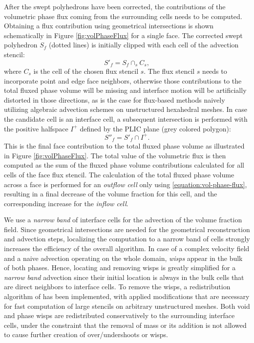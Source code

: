 After the swept polyhedrons have been corrected, the contributions of the volumetric
phase flux coming from the surrounding cells needs to be computed. Obtaining a
flux contribution using geometrical intersections is shown schematically in
Figure \ref{fig:volPhaseFlux} for a single face. The corrected swept 
polyhedron $S_f$ (dotted lines) is initially clipped with each cell of the 
advection stencil:
%
\begin{equation}
   S'_f = S_f \cap_s C_s,  
\end{equation}
%
where $C_s$ is the cell of the chosen flux stencil $s$. The flux stencil $s$
needs to incorporate point and edge face neighbors, otherwise those
contributions to the total fluxed phase volume will be missing and interface
motion will be artificially distorted in those directions, as is the case
for flux-based methods naively utilizing algebraic advection schemes on 
unstructured hexahedral meshes. In case the candidate cell is an interface 
cell, a subsequent intersection is performed with the positive halfspace 
$I^+$ defined by the PLIC plane (grey colored polygon):
%
\begin{equation}
    S''_f = S'_f \cap I^+.
\end{equation}
%
This is the final face contribution to the total fluxed phase volume as illustrated
in Figure \ref{fig:volPhaseFlux}. The total value of the volumetric flux is
then computed as the sum of the fluxed phase volume contributions calculated for
all cells of the face flux stencil. The calculation of the total fluxed phase
volume across a face is performed for an \emph{outflow cell} only using 
\eqref{equation:vol-phase-flux}, resulting in a final decrease of the volume 
fraction for this cell, and the corresponding increase for the \emph{inflow cell}. 

We use a \emph{narrow band} of interface cells for the advection of the volume
fraction field. %
Since geometrical intersections are needed for the geometrical reconstruction and
advection steps, localizing the computation to a narrow band of cells strongly
increases the efficiency of the overall algorithm. In case of a complex
velocity field and a naive advection operating on the whole domain,
\emph{wisps} appear in the bulk of both phases. Hence, locating and removing
wisps is greatly simplified for a \emph{narrow band} advection since their
initial location is always in the bulk cells that are direct neighbors to
interface cells. To remove the wisps, a redistribution algorithm of
\citet{HarvieFletcherStream2000} has been implemented, with applied
modifications that are necessary for fast computation of large stencils on
arbitrary unstructured meshes. Both void and phase wisps are redistributed
conservatively to the surrounding interface cells, under the constraint that
the removal of mass or its addition is not allowed to cause further creation of
over/undershoots or wisps. 

